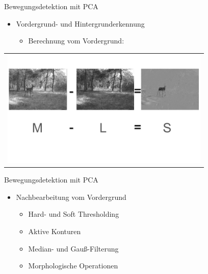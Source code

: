 \begin{frame}[t,fragile]{Bewegungsdetektion mit  PCA}
	\begin{itemize}
 \item Vordergrund- und Hintergrunderkennung
 \begin{itemize}
        \item{Berechnung vom Vordergrund:}
      \end{itemize}
  \end{itemize}

  \vspace{0.01em}
  {
\begin{table}
\centering
        \begin{tabular}{c}
        \includegraphics[width=10cm]{images/Segmentierung/foreground-image}
         \end{tabular}
        
\end{table}
 }
\end{frame}

\begin{frame}[t,fragile]{Bewegungsdetektion mit  PCA}
	\begin{itemize}
 \item{Nachbearbeitung vom Vordergrund}
 \begin{itemize}
        \item{Hard- und  Soft Thresholding}
		\item{Aktive Konturen}
		\item{Median- und Gauß-Filterung}
 		\item{Morphologische Operationen}
      \end{itemize}
  \end{itemize}
\end{frame}


